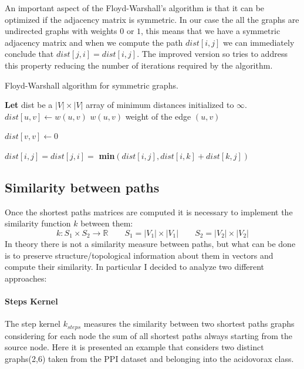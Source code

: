 \documentclass[11pt,a4paper]{article}
\begin{document}
An important aspect of the Floyd-Warshall's algorithm is that it can be optimized if the adjacency matrix is symmetric. In our case the all the graphs are undirected graphs with weights $0$ or $1$, this means that we have a symmetric adjacency matrix and when we compute the path $dist[i,j]$ we can immediately conclude that $dist[j,i] = dist[i,j]$. The improved version so tries to address this property reducing the number of iterations required by the algorithm.
\begin{algorithm}
	\caption{Floyd-Warshall algorithm for symmetric graphs.}
	\begin{algorithmic}[1]
		\State \textbf{Let} dist be a $|V| \times |V|$ array of minimum distances initialized to $\infty$.
		\State $dist[u,v] \leftarrow w(u,v)$ \Comment $w(u,v)$ weight of the edge $(u,v)$
		\EndFor
		
		
		\State $dist[v,v] \leftarrow 0$ 
		\EndFor
		
		
		
		
		
		\State $dist[i,j]= dist[j,i] =$ \textbf{min}$(dist[i,j], dist[i,k] + dist[k,j])$
		\EndFor
		\EndFor
		\EndFor
		\EndProcedure
	\end{algorithmic}
\end{algorithm}

\subsection{Similarity between paths}
Once the shortest paths matrices are computed it is necessary to implement the similarity function $k$ between them:
$$ k:S_1\times S_2\rightarrow \mathbb{R} \qquad S_1 = |V_1| \times |V_1| \qquad S_2 = |V_2| \times |V_2|$$
In theory there is not a similarity measure between paths, but what can be done is to preserve structure/topological information about them in vectors and compute their similarity. In particular I decided to analyze two different approaches:

\paragraph{Steps Kernel} The step kernel $k_{steps}$ measures the similarity between two shortest paths graphs considering for each node the sum of all shortest paths always starting from the source node.
Here it is presented an example that considers two distinct graphs(2,6) taken from the PPI dataset and belonging into the acidovorax class.
\end{document}
